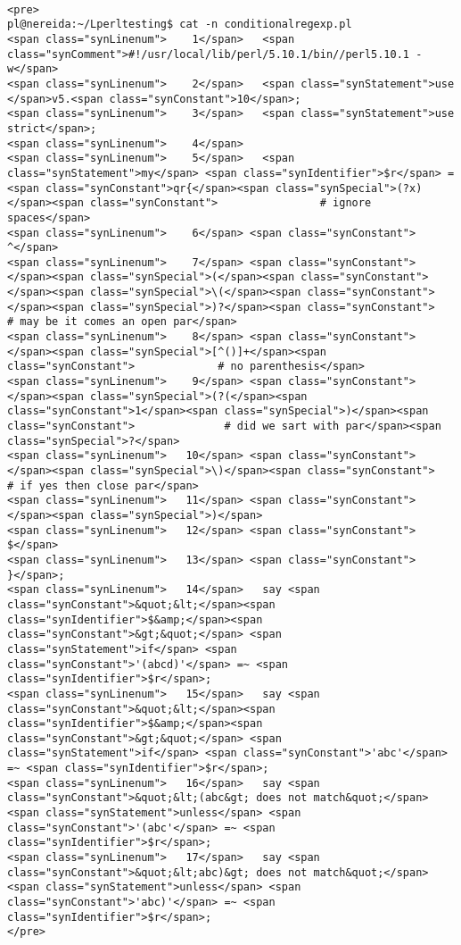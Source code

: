 \begin{verbatim}

<pre>
pl@nereida:~/Lperltesting$ cat -n conditionalregexp.pl
<span class="synLinenum">    1</span>   <span class="synComment">#!/usr/local/lib/perl/5.10.1/bin//perl5.10.1 -w</span>
<span class="synLinenum">    2</span>   <span class="synStatement">use </span>v5.<span class="synConstant">10</span>;
<span class="synLinenum">    3</span>   <span class="synStatement">use strict</span>;
<span class="synLinenum">    4</span> 
<span class="synLinenum">    5</span>   <span class="synStatement">my</span> <span class="synIdentifier">$r</span> = <span class="synConstant">qr{</span><span class="synSpecial">(?x)</span><span class="synConstant">                # ignore spaces</span>
<span class="synLinenum">    6</span> <span class="synConstant">              ^</span>
<span class="synLinenum">    7</span> <span class="synConstant">              </span><span class="synSpecial">(</span><span class="synConstant"> </span><span class="synSpecial">\(</span><span class="synConstant"> </span><span class="synSpecial">)?</span><span class="synConstant">            # may be it comes an open par</span>
<span class="synLinenum">    8</span> <span class="synConstant">              </span><span class="synSpecial">[^()]+</span><span class="synConstant">             # no parenthesis</span>
<span class="synLinenum">    9</span> <span class="synConstant">              </span><span class="synSpecial">(?(</span><span class="synConstant">1</span><span class="synSpecial">)</span><span class="synConstant">              # did we sart with par</span><span class="synSpecial">?</span>
<span class="synLinenum">   10</span> <span class="synConstant">                </span><span class="synSpecial">\)</span><span class="synConstant">               # if yes then close par</span>
<span class="synLinenum">   11</span> <span class="synConstant">              </span><span class="synSpecial">)</span>
<span class="synLinenum">   12</span> <span class="synConstant">              $</span>
<span class="synLinenum">   13</span> <span class="synConstant">            }</span>;
<span class="synLinenum">   14</span>   say <span class="synConstant">&quot;&lt;</span><span class="synIdentifier">$&amp;</span><span class="synConstant">&gt;&quot;</span> <span class="synStatement">if</span> <span class="synConstant">'(abcd)'</span> =~ <span class="synIdentifier">$r</span>;
<span class="synLinenum">   15</span>   say <span class="synConstant">&quot;&lt;</span><span class="synIdentifier">$&amp;</span><span class="synConstant">&gt;&quot;</span> <span class="synStatement">if</span> <span class="synConstant">'abc'</span> =~ <span class="synIdentifier">$r</span>;
<span class="synLinenum">   16</span>   say <span class="synConstant">&quot;&lt;(abc&gt; does not match&quot;</span> <span class="synStatement">unless</span> <span class="synConstant">'(abc'</span> =~ <span class="synIdentifier">$r</span>;
<span class="synLinenum">   17</span>   say <span class="synConstant">&quot;&lt;abc)&gt; does not match&quot;</span> <span class="synStatement">unless</span> <span class="synConstant">'abc)'</span> =~ <span class="synIdentifier">$r</span>;
</pre>

\end{verbatim}%

